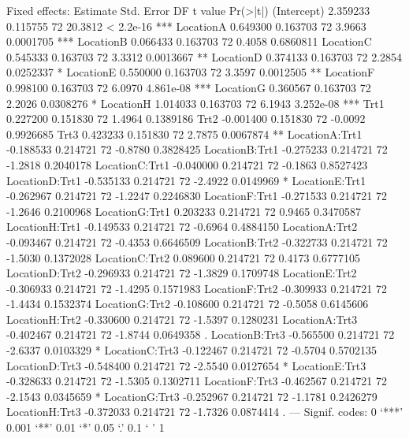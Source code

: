 \documentclass[12pt]{article}
\begin{document}
\begin{Schunk}
\begin{Soutput}
Fixed effects:
                Estimate Std. Error DF t value  Pr(>|t|)    
(Intercept)     2.359233   0.115755 72 20.3812 < 2.2e-16 ***
LocationA       0.649300   0.163703 72  3.9663 0.0001705 ***
LocationB       0.066433   0.163703 72  0.4058 0.6860811    
LocationC       0.545333   0.163703 72  3.3312 0.0013667 ** 
LocationD       0.374133   0.163703 72  2.2854 0.0252337 *  
LocationE       0.550000   0.163703 72  3.3597 0.0012505 ** 
LocationF       0.998100   0.163703 72  6.0970 4.861e-08 ***
LocationG       0.360567   0.163703 72  2.2026 0.0308276 *  
LocationH       1.014033   0.163703 72  6.1943 3.252e-08 ***
Trt1            0.227200   0.151830 72  1.4964 0.1389186    
Trt2           -0.001400   0.151830 72 -0.0092 0.9926685    
Trt3            0.423233   0.151830 72  2.7875 0.0067874 ** 
LocationA:Trt1 -0.188533   0.214721 72 -0.8780 0.3828425    
LocationB:Trt1 -0.275233   0.214721 72 -1.2818 0.2040178    
LocationC:Trt1 -0.040000   0.214721 72 -0.1863 0.8527423    
LocationD:Trt1 -0.535133   0.214721 72 -2.4922 0.0149969 *  
LocationE:Trt1 -0.262967   0.214721 72 -1.2247 0.2246830    
LocationF:Trt1 -0.271533   0.214721 72 -1.2646 0.2100968    
LocationG:Trt1  0.203233   0.214721 72  0.9465 0.3470587    
LocationH:Trt1 -0.149533   0.214721 72 -0.6964 0.4884150    
LocationA:Trt2 -0.093467   0.214721 72 -0.4353 0.6646509    
LocationB:Trt2 -0.322733   0.214721 72 -1.5030 0.1372028    
LocationC:Trt2  0.089600   0.214721 72  0.4173 0.6777105    
LocationD:Trt2 -0.296933   0.214721 72 -1.3829 0.1709748    
LocationE:Trt2 -0.306933   0.214721 72 -1.4295 0.1571983    
LocationF:Trt2 -0.309933   0.214721 72 -1.4434 0.1532374    
LocationG:Trt2 -0.108600   0.214721 72 -0.5058 0.6145606    
LocationH:Trt2 -0.330600   0.214721 72 -1.5397 0.1280231    
LocationA:Trt3 -0.402467   0.214721 72 -1.8744 0.0649358 .  
LocationB:Trt3 -0.565500   0.214721 72 -2.6337 0.0103329 *  
LocationC:Trt3 -0.122467   0.214721 72 -0.5704 0.5702135    
LocationD:Trt3 -0.548400   0.214721 72 -2.5540 0.0127654 *  
LocationE:Trt3 -0.328633   0.214721 72 -1.5305 0.1302711    
LocationF:Trt3 -0.462567   0.214721 72 -2.1543 0.0345659 *  
LocationG:Trt3 -0.252967   0.214721 72 -1.1781 0.2426279    
LocationH:Trt3 -0.372033   0.214721 72 -1.7326 0.0874414 .  
---
Signif. codes:  0 `***' 0.001 `**' 0.01 `*' 0.05 `.' 0.1 ` ' 1 


\end{Soutput}
\end{Schunk}
\end{document}
